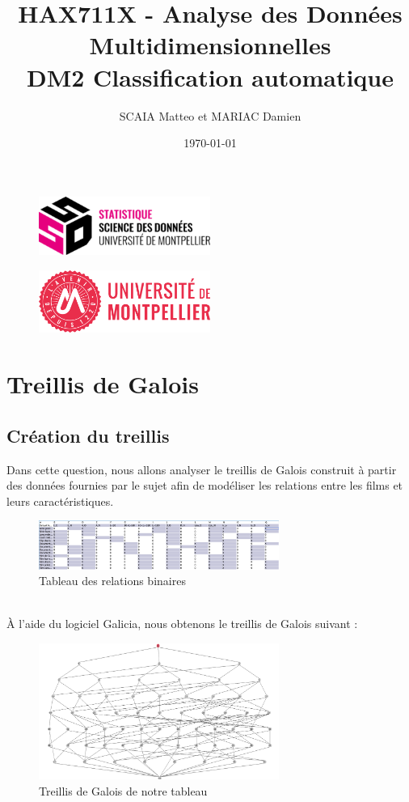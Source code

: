 \documentclass{article}
\title{HAX711X - Analyse des Données Multidimensionnelles \\ DM2 Classification automatique}
\author{SCAIA Matteo et MARIAC Damien}
\date{\today}
\begin{document}
\maketitle

\begin{figure}[h] 
    \centering
    \includegraphics[width=0.5\textwidth]{ssd_logo.png} 
\end{figure}

\begin{figure}[h] 
    \centering
    \includegraphics[width=0.5\textwidth]{logo_um_2022_rouge_RVB.png} 
\end{figure}

\newpage

\tableofcontents

\newpage
\section{Treillis de Galois}
\subsection{Création du treillis}
Dans cette question, nous allons analyser le treillis de Galois construit à partir des données fournies par le sujet afin de modéliser les relations entre les films et leurs caractéristiques.
\begin{figure}[h]
    \centering
    \includegraphics[width=0.7\textwidth]{tableau.png}
    \caption{Tableau des relations binaires}
    \label{fig:tableau} 
\end{figure}
\\
À l'aide du logiciel Galicia, nous obtenons le treillis de Galois suivant :
\begin{figure}[h]
    \centering
    \includegraphics[width=0.7\textwidth]{treillis.png}
    \caption{Treillis de Galois de notre tableau}
    \label{fig:treillis} 
\end{figure}
\\
\end{document}
